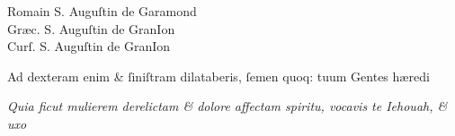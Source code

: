 \documentclass{article}
\newcommand{\threecolumntypefacenames}[3]{\begin{multicols}{3}
		\tiny
		\hfill \qquad \qquad \qquad \qquad #1\hspace*{\fill}\\
		\columnbreak
		\hfill #2\hspace*{\fill}\\
		\columnbreak
		\hfill #3\qquad \qquad \qquad \qquad \hspace*{\fill}
\end{multicols}}
\newcommand{\greektext}{ϖςηλϑεν αὐτώ ο ἐκατον ζαϱχος, παρακαλων αυτον ϗ λἐγων,Κυε ο παις μβὲβλη }
\begin{document}
\vspace{-3\baselineskip}
\threecolumntypefacenames{Romain S. Auguſtin de Garamond}{Gr\ae{}c. S. Auguſtin de GranIon}{Curſ. S. Auguſtin de GranIon}
\vspace{-2\baselineskip}
\begin{multicols}{2}
	\fontsize{8}{9}\selectfont
	\justifying
	\noindent \quad Ad dexteram enim \& ſiniſtram dilataberis, ſemen quoq: tuum Gentes h\ae{}redi\linebreak

	\columnbreak
	\fontsize{8}{9}\selectfont
	\justifying
	\noindent
	\textit{Quia ficut mulierem derelictam \& dolore affectam spiritu, vocavis te Iehouah, \& uxo\linebreak}
\end{multicols}
\fontsize{8}{9}\selectfont
\vspace{-2.3\baselineskip}
\end{document}

